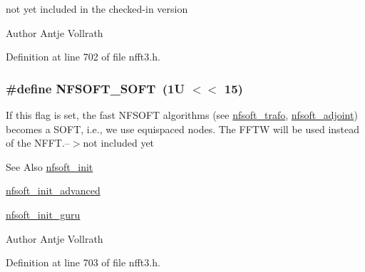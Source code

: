not yet included in the checked-\/in version

\begin{DoxyAuthor}{Author}
Antje Vollrath 
\end{DoxyAuthor}


Definition at line 702 of file nfft3.\-h.

\hypertarget{group__nfsoft_ga07ad8a429e8451bd153563eedc3ef0bf}{
\subsubsection[{N\-F\-S\-O\-F\-T\-\_\-\-S\-O\-F\-T}]{\setlength{\rightskip}{0pt plus 5cm}\#define N\-F\-S\-O\-F\-T\-\_\-\-S\-O\-F\-T~(1\-U $<$$<$ 15)}}\label{group__nfsoft_ga07ad8a429e8451bd153563eedc3ef0bf}
If this flag is set, the fast N\-F\-S\-O\-F\-T algorithms (see \hyperlink{group__nfsoft_gae243cd75d7571a99eae53818e32355fb}{nfsoft\-\_\-trafo}, \hyperlink{group__nfsoft_ga08395b1dd90f9a2565685d17460afc5b}{nfsoft\-\_\-adjoint}) becomes a S\-O\-F\-T, i.\-e., we use equispaced nodes. The F\-F\-T\-W will be used instead of the N\-F\-F\-T.--$>$not included yet

\begin{DoxySeeAlso}{See Also}
\hyperlink{group__nfsoft_ga31c884458165fa204073c6c16c10775e}{nfsoft\-\_\-init} 

\hyperlink{group__nfsoft_gaf4aec4ee2a2a5d56ca27c4f1a7f90b18}{nfsoft\-\_\-init\-\_\-advanced} 

\hyperlink{group__nfsoft_ga1c13cdd3f82f48fa41acdd313cdc2052}{nfsoft\-\_\-init\-\_\-guru} 
\end{DoxySeeAlso}
\begin{DoxyAuthor}{Author}
Antje Vollrath 
\end{DoxyAuthor}


Definition at line 703 of file nfft3.\-h.

